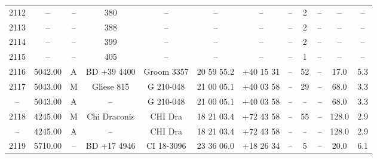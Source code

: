 \begin{table}
\begin{tabular}{cccccccccccc}
2112 & -- & -- & 380 & -- & -- & -- & -- & 2 & -- & -- & -- \\
2113 & -- & -- & 388 & -- & -- & -- & -- & 2 & -- & -- & -- \\
2114 & -- & -- & 399 & -- & -- & -- & -- & 2 & -- & -- & -- \\
2115 & -- & -- & 405 & -- & -- & -- & -- & 1 & -- & -- & -- \\
2116 & 5042.00 & A & BD +39 4400 & Groom 3357 & 20 59 55.2 & +40 15 31 & -- & 52 & -- & 17.0 & 5.3 \\
2117 & 5043.00 & M & Gliese 815 & G 210-048 & 21 00 05.1 & +40 03 58 & -- & 29 & -- & 68.0 & 3.3 \\
-- & 5043.00 & A & -- & G 210-048 & 21 00 05.1 & +40 03 58 & -- & -- & -- & 68.0 & 3.3 \\
2118 & 4245.00 & M & Chi Draconis & CHI Dra & 18 21 03.4 & +72 43 58 & -- & 55 & -- & 128.0 & 2.9 \\
-- & 4245.00 & A & -- & CHI Dra & 18 21 03.4 & +72 43 58 & -- & -- & -- & 128.0 & 2.9 \\
2119 & 5710.00 & -- & BD +17 4946 & CI 18-3096 & 23 36 06.0 & +18 26 34 & -- & 5 & -- & 20.0 & 6.1 \\
\hline
\end{tabular}
\end{table}
